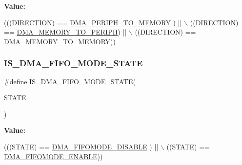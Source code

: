 {\bfseries Value\+:}
\begin{DoxyCode}
(((DIRECTION) == \mbox{\hyperlink{group___d_m_a___data__transfer__direction_gacb2cbf03ecae6804ae4a6f60a3e37c12}{DMA\_PERIPH\_TO\_MEMORY}} ) || \(\backslash\)
                                     ((DIRECTION) == \mbox{\hyperlink{group___d_m_a___data__transfer__direction_ga9e76fc559a2d5c766c969e6e921b1ee9}{DMA\_MEMORY\_TO\_PERIPH}})  || \(\backslash\)
                                     ((DIRECTION) == \mbox{\hyperlink{group___d_m_a___data__transfer__direction_ga0695035d725855ccf64d2d8452a33810}{DMA\_MEMORY\_TO\_MEMORY}}))
\end{DoxyCode}
\mbox{\label{group___d_m_a___private___macros_gadb90a893aeb49fd4bc14af750af3837c}} 
\subsubsection{\texorpdfstring{I\+S\+\_\+\+D\+M\+A\+\_\+\+F\+I\+F\+O\+\_\+\+M\+O\+D\+E\+\_\+\+S\+T\+A\+TE}{IS\_DMA\_FIFO\_MODE\_STATE}}
{\footnotesize\ttfamily \#define I\+S\+\_\+\+D\+M\+A\+\_\+\+F\+I\+F\+O\+\_\+\+M\+O\+D\+E\+\_\+\+S\+T\+A\+TE(\begin{DoxyParamCaption}\item[{}]{S\+T\+A\+TE }\end{DoxyParamCaption})}

{\bfseries Value\+:}
\begin{DoxyCode}
(((STATE) == \mbox{\hyperlink{group___d_m_a___f_i_f_o__direct__mode_gaec22b199f9da9214bf908d7edbcd83e8}{DMA\_FIFOMODE\_DISABLE}} ) || \(\backslash\)
                                       ((STATE) == \mbox{\hyperlink{group___d_m_a___f_i_f_o__direct__mode_ga18709570bed6b9112520701c482fbe4b}{DMA\_FIFOMODE\_ENABLE}}))
\end{DoxyCode}
\mbox{\label{group___d_m_a___private___macros_gaeafc0d9e327d6e5b26cd37f6744b232f}} 
